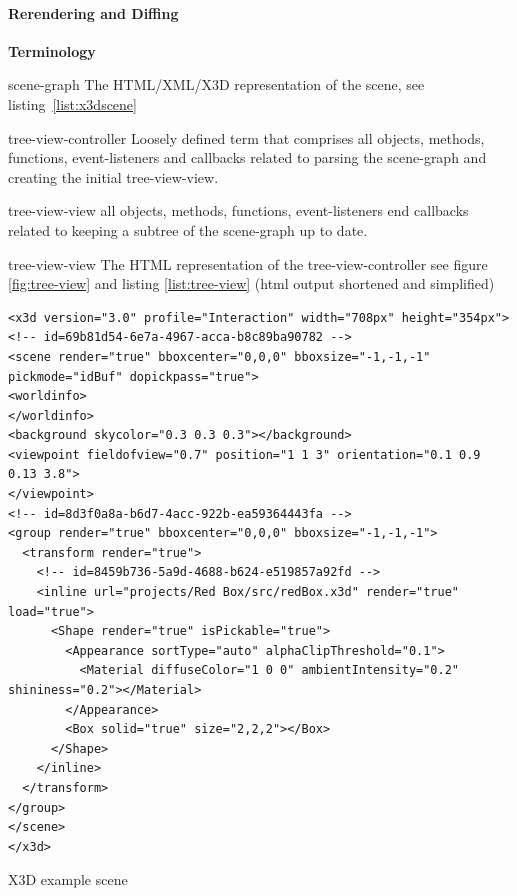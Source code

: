 \clearpage
\paragraph{Rerendering and Diffing}
\label{rerendering-and-diffing}

\textbf{Terminology}

\begin{description*}
  \item[scene-graph]
    The HTML/XML/X3D representation of the scene, see listing~\ref{list:x3dscene}
  \item[tree-view-controller]
    Loosely defined term that comprises all objects, methods, functions,
    event-listeners and callbacks related to parsing the scene-graph and
    creating the initial tree-view-view.
  \item[tree-view-view]
    all objects, methods, functions, event-listeners end callbacks related
    to keeping a subtree of the scene-graph up to date.
  \item[tree-view-view]
    The HTML representation of the tree-view-controller see figure \ref{fig:tree-view} and listing \ref{list:tree-view} (html output
    shortened and simplified)
\end{description*}

\begin{listing}
  \begin{verbatim}
<x3d version="3.0" profile="Interaction" width="708px" height="354px">
<!-- id=69b81d54-6e7a-4967-acca-b8c89ba90782 -->
<scene render="true" bboxcenter="0,0,0" bboxsize="-1,-1,-1" pickmode="idBuf" dopickpass="true">
<worldinfo>
</worldinfo>
<background skycolor="0.3 0.3 0.3"></background>
<viewpoint fieldofview="0.7" position="1 1 3" orientation="0.1 0.9 0.13 3.8">
</viewpoint>
<!-- id=8d3f0a8a-b6d7-4acc-922b-ea59364443fa -->
<group render="true" bboxcenter="0,0,0" bboxsize="-1,-1,-1">
  <transform render="true">
    <!-- id=8459b736-5a9d-4688-b624-e519857a92fd -->
    <inline url="projects/Red Box/src/redBox.x3d" render="true" load="true">
      <Shape render="true" isPickable="true">
        <Appearance sortType="auto" alphaClipThreshold="0.1">
          <Material diffuseColor="1 0 0" ambientIntensity="0.2" shininess="0.2"></Material>
        </Appearance>
        <Box solid="true" size="2,2,2"></Box>
      </Shape>
    </inline>
  </transform>
</group>
</scene>
</x3d>
  \end{verbatim}
	\caption{X3D example scene}
	\label{list:x3dscene}
\end{listing}

